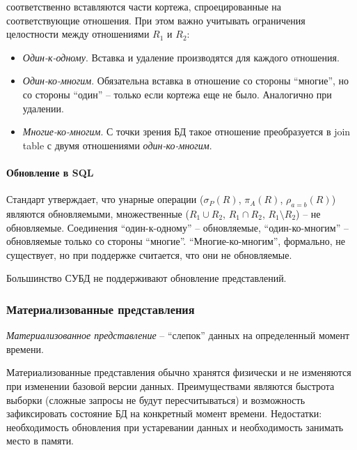 \begin{itemize}
	      соответственно вставляются
	      части кортежа, спроецированные на соответствующие отношения. При этом важно учитывать ограничения
	      целостности между отношениями $R_1$ и $R_2$:
	      \begin{itemize}
		      \item \textit{Один-к-одному}. Вставка и удаление производятся для каждого отношения.
		      \item \textit{Один-ко-многим}. Обязательна вставка в отношение со стороны ``многие'',
		            но со стороны ``один'' -- только если кортежа еще не было. Аналогично при удалении.
		      \item \textit{Многие-ко-многим}. С точки зрения БД такое отношение преобразуется в join
		            table с двумя отношениями \textit{один-ко-многим}.
	      \end{itemize}
\end{itemize}

\paragraph{Обновление в SQL}

Стандарт утверждает, что унарные операции ($\sigma_P (R)$, $\pi_A(R)$,
$\rho_{a=b}(R)$) являются обновляемыми, множественные ($R_1 \cup R_2$,
$R_1 \cap R_2$, $R_1 \setminus R_2$) -- не обновляемые. Соединения ``один-к-одному'' --
обновляемые, ``один-ко-многим'' -- обновляемые только со стороны ``многие''. ``Многие-ко-многим'',
формально, не существует, но при поддержке считается, что они не обновляемые.

\begin{remark}
	Большинство СУБД не поддерживают обновление представлений.
\end{remark}

\subsubsection{Материализованные представления}

\begin{definition}
	\textit{Материализованное представление} -- ``слепок'' данных на определенный момент времени.
\end{definition}

Материализованные представления обычно хранятся физически и не изменяются при изменении базовой
версии данных. Преимуществами являются быстрота выборки (сложные запросы не будут пересчитываться)
и возможность зафиксировать состояние БД на конкретный момент времени. Недостатки: необходимость
обновления при устаревании данных и необходимость занимать место в памяти.

